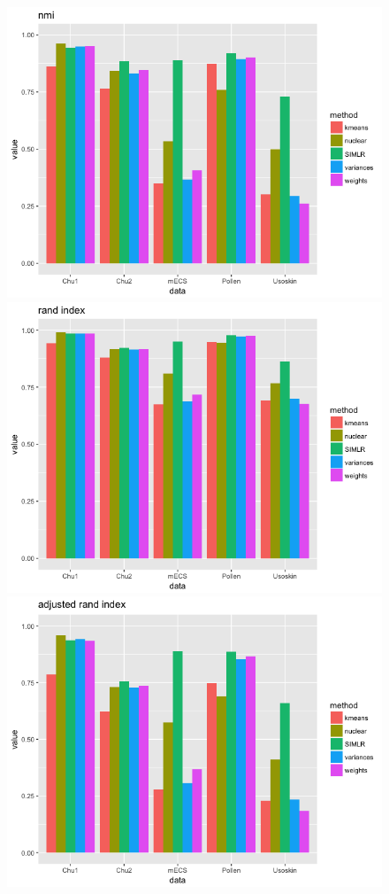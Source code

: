 \documentclass[11pt]{article}
\begin{document}






%
\begin{figure}[h]
\centering
\includegraphics[width=0.45\linewidth]{nmi3.png}
\includegraphics[width=0.45\linewidth]{ri3.png}
\includegraphics[width=0.45\linewidth]{ari3.png}
\end{figure}
\end{document}

